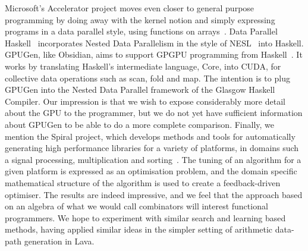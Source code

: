 Microsoft's Accelerator project moves even closer to general purpose programming by doing away with the kernel notion and simply expressing programs in a data parallel style, using functions on arrays~\cite{ACCELERATOR}.
Data Parallel Haskell~\cite{DPH} incorporates Nested Data Parallelism in the style of NESL~\cite{NESL} into Haskell. GPUGen, like Obsidian, aims
to support GPGPU programming from Haskell~\cite{GPUGenTalk}. It works by translating Haskell's intermediate language, Core, into CUDA, for collective data operations such as scan, fold and map. The intention is to plug GPUGen into the Nested Data Parallel framework of the Glasgow Haskell Compiler. Our impression is that we wish to expose considerably more detail about the GPU to the programmer, but we do not yet have sufficient information about GPUGen to be able to do a more complete comparison. Finally, we mention the Spiral project, which develops methods and tools for automatically generating high performance libraries for a variety of platforms, in domains such a signal processing, multiplication and sorting~\cite{Spiral}.
The tuning of an algorithm for a given platform is expressed as an optimisation problem, and the domain specific mathematical structure of the algorithm is used
to create a feedback-driven optimiser. The results are indeed impressive, and we feel that the approach based on an algebra of what we would call combinators
will interest functional programmers. We hope to experiment with similar
search and learning based methods, having applied similar ideas in the simpler setting of arithmetic data-path generation in Lava.

